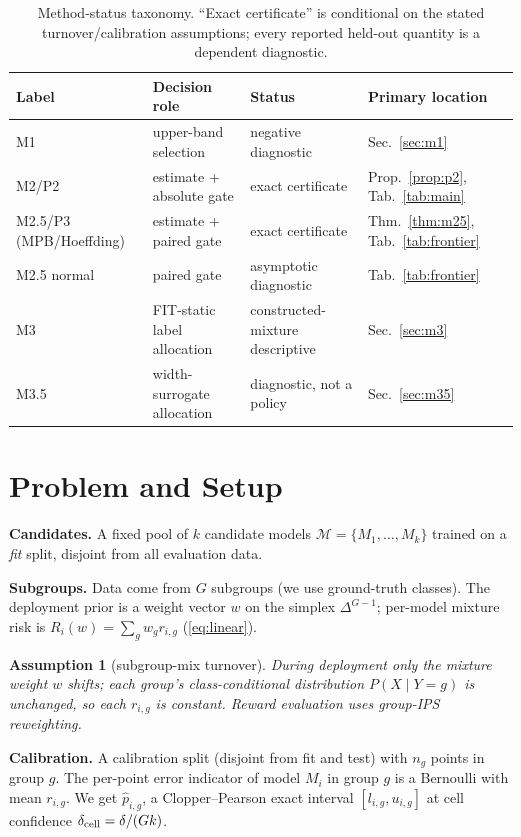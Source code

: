 \documentclass{article}
\newtheorem{assumption}{Assumption}
\begin{document}
\FloatBarrier
\begin{table}[t]
\centering\footnotesize\setlength{\tabcolsep}{2pt}
\begin{tabular}{llll}
\toprule
Label & Decision role & Status & Primary location \\
\midrule
M1 & upper-band selection & negative diagnostic & Sec.~\ref{sec:m1} \\
M2/P2 & estimate + absolute gate & exact certificate & Prop.~\ref{prop:p2}, Tab.~\ref{tab:main} \\
M2.5/P3 (MPB/Hoeffding) & estimate + paired gate & exact certificate & Thm.~\ref{thm:m25}, Tab.~\ref{tab:frontier} \\
M2.5 normal & paired gate & asymptotic diagnostic & Tab.~\ref{tab:frontier} \\
M3 & FIT-static label allocation & constructed-mixture descriptive & Sec.~\ref{sec:m3} \\
M3.5 & width-surrogate allocation & diagnostic, not a policy & Sec.~\ref{sec:m35} \\
\bottomrule
\end{tabular}
\caption{Method-status taxonomy. ``Exact certificate'' is conditional on the stated
turnover/calibration assumptions; every reported held-out quantity is a dependent diagnostic.}
\label{tab:taxonomy}
\end{table}

\section{Problem and Setup}
\label{sec:setup}

\textbf{Candidates.} A fixed pool of $k$ candidate models $\mathcal{M}=\{M_1,\dots,M_k\}$
trained on a \emph{fit} split, disjoint from all evaluation data.

\textbf{Subgroups.} Data come from $G$ subgroups (we use ground-truth classes). The
deployment prior is a weight vector $w$ on the simplex $\Delta^{G-1}$; per-model mixture
risk is $R_i(w)=\sum_g w_g r_{i,g}$ (\eqref{eq:linear}).

\begin{assumption}[subgroup-mix turnover]
\label{ass:turnover}
During deployment only the mixture weight $w$ shifts; each group's class-conditional
distribution $P(X\mid Y{=}g)$ is unchanged, so each $r_{i,g}$ is constant. Reward
evaluation uses group-IPS reweighting.
\end{assumption}

\textbf{Calibration.} A calibration split (disjoint from fit and test) with $n_g$ points in
group $g$. The per-point error indicator of model $M_i$ in group $g$ is a Bernoulli with
mean $r_{i,g}$. We get $\hat p_{i,g}$, a Clopper--Pearson exact interval
$[l_{i,g},u_{i,g}]$ at cell confidence $\delta_{\rm cell}=\delta/(G k)$.
\end{document}
